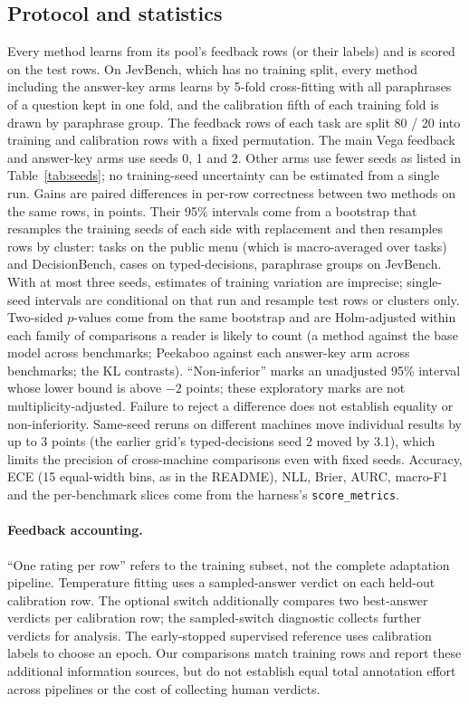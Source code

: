 \documentclass[11pt]{article}
\newcommand{\pk}{Peekaboo}
\begin{document}
\subsection{Protocol and statistics}
Every method learns from its pool's feedback rows (or their labels) and is scored on the test rows. On JevBench, which has no training split, every method including the answer-key arms learns by 5-fold cross-fitting with all paraphrases of a question kept in one fold, and the calibration fifth of each training fold is drawn by paraphrase group. The feedback rows of each task are split 80 / 20 into training and calibration rows with a fixed permutation. The main Vega feedback and answer-key arms use seeds 0, 1 and 2. Other arms use fewer seeds as listed in Table~\ref{tab:seeds}; no training-seed uncertainty can be estimated from a single run. Gains are paired differences in per-row correctness between two methods on the same rows, in points. Their 95\% intervals come from a bootstrap that resamples the training seeds of each side with replacement and then resamples rows by cluster: tasks on the public menu (which is macro-averaged over tasks) and DecisionBench, cases on typed-decisions, paraphrase groups on JevBench. With at most three seeds, estimates of training variation are imprecise; single-seed intervals are conditional on that run and resample test rows or clusters only. Two-sided $p$-values come from the same bootstrap and are Holm-adjusted within each family of comparisons a reader is likely to count (a method against the base model across benchmarks; \pk{} against each answer-key arm across benchmarks; the KL contrasts). ``Non-inferior'' marks an unadjusted 95\% interval whose lower bound is above $-2$ points; these exploratory marks are not multiplicity-adjusted. Failure to reject a difference does not establish equality or non-inferiority. Same-seed reruns on different machines move individual results by up to 3 points (the earlier grid's typed-decisions seed 2 moved by 3.1), which limits the precision of cross-machine comparisons even with fixed seeds. Accuracy, ECE (15 equal-width bins, as in the README), NLL, Brier, AURC, macro-F1 and the per-benchmark slices come from the harness's \texttt{score\_metrics}.

\paragraph{Feedback accounting.}
``One rating per row'' refers to the training subset, not the complete adaptation pipeline. Temperature fitting uses a sampled-answer verdict on each held-out calibration row. The optional switch additionally compares two best-answer verdicts per calibration row; the sampled-switch diagnostic collects further verdicts for analysis. The early-stopped supervised reference uses calibration labels to choose an epoch. Our comparisons match training rows and report these additional information sources, but do not establish equal total annotation effort across pipelines or the cost of collecting human verdicts.
\end{document}

